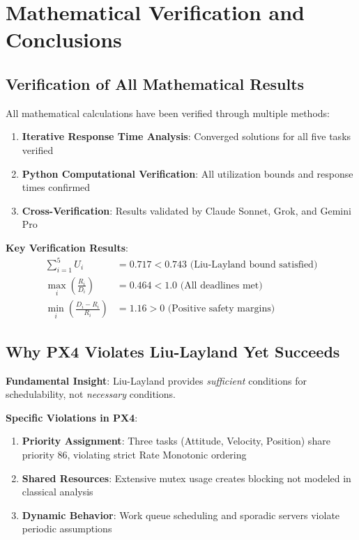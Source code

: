 \documentclass[12pt,a4paper]{article}
\begin{document}
\section{Mathematical Verification and Conclusions}

\subsection{Verification of All Mathematical Results}

All mathematical calculations have been verified through multiple methods:

\begin{enumerate}
\item \textbf{Iterative Response Time Analysis}: Converged solutions for all five tasks verified
\item \textbf{Python Computational Verification}: All utilization bounds and response times confirmed
\item \textbf{Cross-Verification}: Results validated by Claude Sonnet, Grok, and Gemini Pro
\end{enumerate}

\textbf{Key Verification Results}:
\begin{align}
\sum_{i=1}^5 U_i &= 0.717 < 0.743 \text{ (Liu-Layland bound satisfied)} \\
\max_i \left(\frac{R_i}{D_i}\right) &= 0.464 < 1.0 \text{ (All deadlines met)} \\
\min_i \left(\frac{D_i - R_i}{R_i}\right) &= 1.16 > 0 \text{ (Positive safety margins)}
\end{align}

\subsection{Why PX4 Violates Liu-Layland Yet Succeeds}

\textbf{Fundamental Insight}: Liu-Layland provides \emph{sufficient} conditions for schedulability, not \emph{necessary} conditions.

\textbf{Specific Violations in PX4}:
\begin{enumerate}
\item \textbf{Priority Assignment}: Three tasks (Attitude, Velocity, Position) share priority 86, violating strict Rate Monotonic ordering
\item \textbf{Shared Resources}: Extensive mutex usage creates blocking not modeled in classical analysis
\item \textbf{Dynamic Behavior}: Work queue scheduling and sporadic servers violate periodic assumptions
\end{enumerate}
\end{document}
